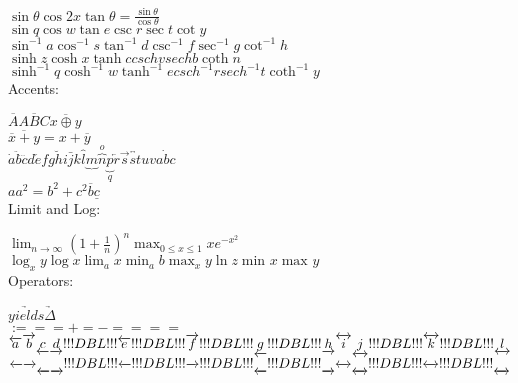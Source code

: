 \documentclass[12pt, a4paper]{article}
\begin{document}
$\sin \theta \cos 2x\tan \theta =\frac{\sin \theta }{\cos \theta }
$\\


$\sin q\cos w\tan e\csc r\sec t\cot y$\\


$\sin ^{-1}a\cos ^{-1}s\tan ^{-1}d\csc ^{-1}f\sec ^{-1
}g\cot ^{-1}h$\\


$\sinh z\cosh x\tanh ccsch vsech b\coth n$\\


$\sinh ^{-1}q\cosh ^{-1}w\tanh ^{-1}ecsch ^{-1}rsech ^{
-1}t\coth ^{-1}y$\\


Accents:

$\overline{A}\overline{ABC}\overline{x\oplus y}$\\


$\overline{\overline{x}+y}=x+\overline{y}$\\


$\dot{a}\ddot{b}\dddot{c}{d}\check{e}{f}{g}\breve{
h}{i}\bar{j}{k}\overbrace{l}\underbrace{m}\overbrace{n
}^{o}\underbrace{p}_{q}\overleftarrow{r}\overrightarrow{ s
}\overleftrightarrow{s t} {u}{v}\dot{abc}$\\


$aa^{2}=b^{2}+c^{2}\overline{b}\underline{c}$\\


Limit and Log:

$\lim _{n\to \infty }(1+\frac{1}{n})^{n}\max _{0\le x\le 
1}xe^{-x^{2}}$\\


$\log _{x}y\log x\lim _{a}x\min _{a}b\max _{x}y\ln z
\min _{}x\max _{}y$\\


Operators:

$\underrightarrow{yields}\underrightarrow{\Delta }$\\


$:===+=-====$\\


$\overleftarrow{a}\overrightarrow{b}\underleftarrow{c}
\underrightarrow{d}!!!DBL!!!\overleftarrow{e}
!!!DBL!!!\overrightarrow{f}!!!DBL!!!\underleftarrow{g}
!!!DBL!!!\underrightarrow{h}\overleftrightarrow{i}
\underleftrightarrow{j}!!!DBL!!!\overleftrightarrow{k}
!!!DBL!!!\underleftrightarrow{l}$\\


$\overleftarrow{}\overrightarrow{}\underleftarrow{}
\underrightarrow{}!!!DBL!!!\overleftarrow{}!!!DBL!!!\overrightarrow{
}!!!DBL!!!\underleftarrow{}!!!DBL!!!\underrightarrow{}
\overleftrightarrow{}\underleftrightarrow{}
!!!DBL!!!\overleftrightarrow{}!!!DBL!!!\underleftrightarrow{}$\\
\end{document}
